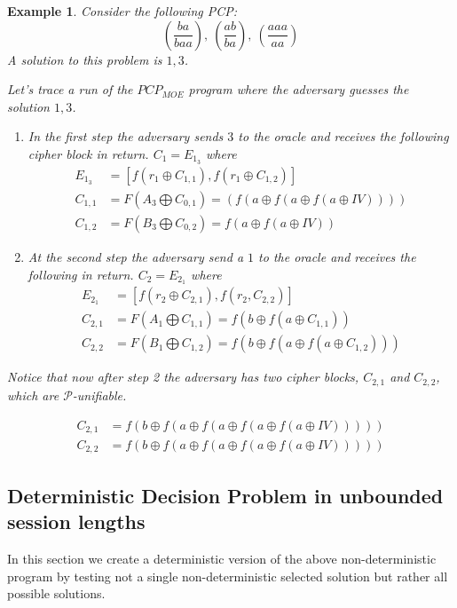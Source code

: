 \documentclass{easychair}
\newtheorem{example}{Example}
\begin{document}
\begin{example}
	Consider the following PCP:
	\[
	(\frac{ba}{baa}),~(\frac{ab}{ba}),~(\frac{aaa}{aa})
	\] 
	A solution to this problem is $1,3$. 
	
	Let's trace a run of the $PCP_{MOE}$ program where the 
	adversary guesses the solution $1,3$.
	\begin{enumerate}
		\item In the first step the adversary sends $3$ to the
		oracle and receives the following cipher block in return.
		$C_1 = E_{1_3}$ where
		\begin{align*}
		E_{1_3} &= [f(r_1 \oplus C_{1, 1}), f(r_1 \oplus C_{1,2}) ] \\
		C_{1,1} &= F(A_3 \bigoplus C_{0, 1}) = 
		(f(a \oplus f(a \oplus f(a \oplus IV))))	\\
		C_{1,2} &= F(B_3 \bigoplus C_{0, 2}) =
		f(a \oplus f(a \oplus IV))
		\end{align*}
		\item At the second step the adversary send a $1$ to the
		oracle and receives the following in return.
		$C_2 = E_{2_1}$ where
		\begin{align*}
		E_{2_1} &= [f(r_2 \oplus C_{2, 1}), f(r_2, C_{2,2}) ] \\
		C_{2,1} &= F(A_1 \bigoplus C_{1, 1}) = 
		f(b \oplus f(a \oplus C_{1,1}))	\\
		C_{2,2} &= F(B_1 \bigoplus C_{1, 2}) =
		f(b \oplus f(a \oplus f(a \oplus C_{1,2})))
		\end{align*}
	\end{enumerate}
	Notice that now after step 2 the adversary has two 
	cipher blocks, $C_{2,1}$ and $C_{2,2}$, which are
	$\mathcal{P}$-unifiable.
	
\begin{align*}
C_{2,1} &= f(b \oplus f(a \oplus f(a \oplus f(a \oplus f(a \oplus IV))))) \\
C_{2,2} &= f(b \oplus f(a \oplus f(a \oplus f(a \oplus f(a \oplus IV)))))
\end{align*}

\end{example}


\subsection{Deterministic Decision Problem in unbounded session lengths}
In this section we create a deterministic version of the 
above non-deterministic program by testing not a single 
non-deterministic selected solution but rather all possible
solutions. 
\end{document}
